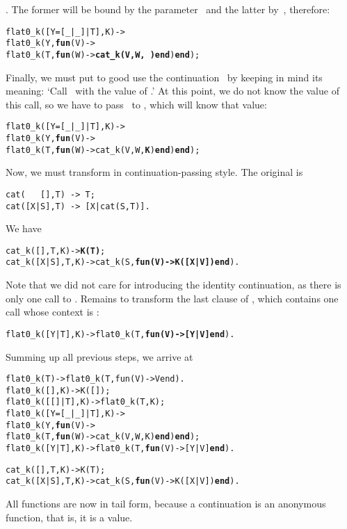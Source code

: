 . The former will be bound by the
parameter~ and the latter by~, therefore:
\begin{alltt}
flat0\_k([Y=[\_|\_]|T],K) ->
  flat0\_k(Y,\textbf{fun}(V) ->
              flat0\_k(T,\textbf{fun}(W) -> \textbf{cat\_k(V,W,\,)} \textbf{end}) \textbf{end});
\end{alltt}
Finally, we must put to good use the continuation~ by
keeping in mind its meaning: `Call~ with the value of
.' At this point, we do not know the
value of this call, so we have to pass~
to , which will know that value:
\begin{alltt}
flat0\_k([Y=[\_|\_]|T],K) ->
  flat0\_k(Y,\textbf{fun}(V) ->
              flat0\_k(T,\textbf{fun}(W) -> cat\_k(V,W,\textbf{K}) \textbf{end}) \textbf{end});
\end{alltt}
Now, we must transform  in continuation\hyp{}passing
style. The original  is
\begin{verbatim}
cat(   [],T) -> T;
cat([X|S],T) -> [X|cat(S,T)].
\end{verbatim}
We have
\begin{alltt}
cat\_k(   [],T,K) -> \textbf{K(T)};
cat\_k([X|S],T,K) -> cat\_k(S,\textbf{fun(V) -> K([X|V]) end}).
\end{alltt}
Note that we did not care for introducing the identity continuation,
as there is only one call to . Remains to transform
the last clause of , which contains one call whose
context is \erlcode{[Y|\textvisiblespace]}:
\begin{alltt}
flat0\_k(      [Y|T],K) -> flat0\_k(T,\textbf{fun(V) -> [Y|V] end}).
\end{alltt}
Summing up all previous steps, we arrive at
\begin{alltt}
flat0_k(T)             -> flat0_k(T,fun(V) -> V end).
flat0_k(         [],K) -> K([]);
flat0_k(     [[]|T],K) -> flat0_k(T,K);
flat0_k([Y=[_|_]|T],K) ->
  flat0_k(Y,\textbf{fun}(V) ->
              flat0_k(T,\textbf{fun}(W) -> cat_k(V,W,K) \textbf{end}) \textbf{end});
flat0_k(      [Y|T],K) -> flat0_k(T,\textbf{fun}(V) -> [Y|V] \textbf{end}).

cat_k(   [],T,K) -> K(T);
cat_k([X|S],T,K) -> cat_k(S,\textbf{fun}(V) -> K([X|V]) \textbf{end}).
\end{alltt}
All functions are now in tail form, because a continuation is an
anonymous function, that is, it is a value.

